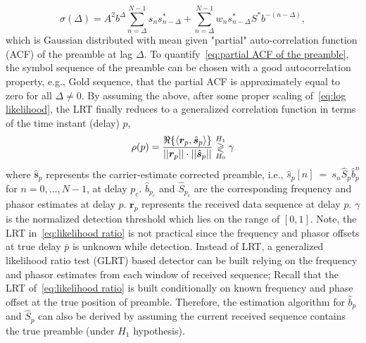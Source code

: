 \begin{equation}
    \label{eq:partial ACF of the preamble}
    \sigma(\Delta)=A^2b^{\Delta}\sum_{n=\Delta}^{N-1}s_ns^*_{n-\Delta}+\sum_{n=\Delta}^{N-1}w_ns^*_{n-\Delta}S^*b^{-(n-\Delta)},
\end{equation}
which is Gaussian distributed with mean given  "partial" auto-correlation function (ACF) of the preamble at lag $\Delta$.
To quantify~\eqref{eq:partial ACF of the preamble}, the symbol sequence of the preamble can be chosen with a good autocorrelation property,
e.g., Gold sequence, that the partial ACF is approximately equal to zero for all $\Delta \neq 0$. 
By assuming the above, after some proper scaling of~\eqref{eq:log likelihood}, the LRT 
finally reduces to a generalized correlation function in terms of the time instant (delay) $p$,
\begin{equation}
    \label{eq:generalized_corr}
    \rho(p)=
    \frac{\Re\{\langle
      \bm{r}_{p},\hat{\bm{s}}_{p}\rangle\}}
    {||\bm{r}_{p}||\cdot||\hat{\bm{s}}_{p}||} \mathrel{\mathop\gtrless\limits^{H_1}_{H_0}} \gamma
  \end{equation}
where $\hat{\bm{s}}_{p}$ represents the carrier-estimate corrected preamble, i.e., $\hat{s}_{p}[n]~{=}~s_{n}\hat{S}_{p}\hat{b}_{p}^n$ for $n=0,\ldots,N{-}1$,
at delay $p_c$. $\hat{b}_{p_c}$ and $\hat{S}_{p_c}$ are the corresponding frequency and phasor estimates at delay $p$.
$\bm{r}_{p}$ represents the received data sequence at delay $p$.
$\gamma$ is the normalized detection threshold which lies on the range of $[0,1]$.
Note, the LRT in~\eqref{eq:likelihood ratio} is not practical since the frequency and phasor offsets at true delay $\bar{p}$
is unknown while detection. Instead of LRT, a generalized likelihood ratio test (GLRT) based detector can be built relying on the frequency and phasor estimates from each window of received sequence;
Recall that the LRT of~\eqref{eq:likelihood ratio} is built conditionally on known frequency and phase offset 
at the true position of preamble.
Therefore, the estimation algorithm for $\hat{b}_{p}$ and $\hat{S}_{p}$ can also be derived by
assuming the current received sequence contains the true preamble (under $H_1$ hypothesis).

